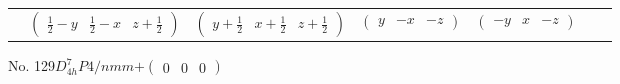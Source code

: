 \documentclass[fleqn,9pt,landscape]{jsarticle}
\begin{document}
\begin{center}
\begin{longtable}{ccccccc}
& $ \begin{pmatrix} \frac{1}{2} - y & \frac{1}{2} - x & z + \frac{1}{2} \end{pmatrix} $ & $ \begin{pmatrix} y + \frac{1}{2} & x + \frac{1}{2} & z + \frac{1}{2} \end{pmatrix} $ & $ \begin{pmatrix} y & - x & - z \end{pmatrix} $ & $ \begin{pmatrix} - y & x & - z \end{pmatrix} $ & $  $ & $  $ \\
\end{longtable}
\end{center}
\newpage
No. 129\quad$D_{4h}^{7}$\quad$P4/nmm$\quad[ tetragonal ]\quad$+\begin{pmatrix} 0 & 0 & 0 \end{pmatrix}$
\end{document}
